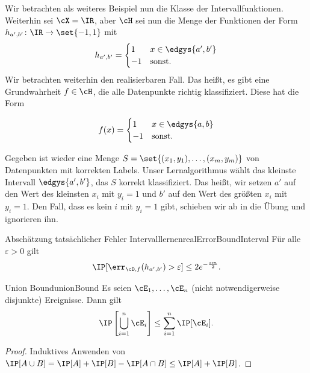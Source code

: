 \documentclass[language=ngerman,algolist,acrolist]{TemplateLecture}
\begin{document}
Wir betrachten als weiteres Beispiel nun die Klasse der Intervallfunktionen. Weiterhin sei $\cX = \IR$, aber $\cH$ sei nun die Menge der Funktionen der Form $h_{a', b'} \colon \IR \to \set{-1,1}$ mit 
\begin{equation*}
    h_{a', b'} = \begin{cases}
        1 & x \in \edgys{a', b'} \\
        -1 & \text{sonst}.
    \end{cases}
\end{equation*}
Wir betrachten weiterhin den realisierbaren Fall. Das heißt, es gibt eine Grundwahrheit $f \in \cH$, die alle Datenpunkte richtig klassifiziert. Diese hat die Form

\begin{equation*}
    f(x) = \begin{cases}
        1 & x \in \edgys{a, b} \\
        -1 & \text{sonst}.
    \end{cases}
\end{equation*}

Gegeben ist wieder eine Menge $S = \set{(x_1, y_1), \dots ,(x_m, y_m)}$ von Datenpunkten mit korrekten Labels. Unser Lernalgorithmus wählt das kleinste Intervall $\edgys{a', b'}$, das $S$ korrekt klassifiziert. Das heißt, wir setzen $a'$ auf den Wert des kleinsten $x_i$ mit $y_i = 1$ und $b'$ auf den Wert des größten $x_i$ mit $y_i = 1$. 
Den Fall, dass es kein $i$ mit $y_i = 1$ gibt, schieben wir ab in die Übung und ignorieren ihn.

\begin{thm}{Abschätzung tatsächlicher Fehler Intervalllernen}{realErrorBoundInterval}
    Für alle $\varepsilon > 0$ gilt 
    \begin{equation*}
        \IP[\err_{\cD, f}(h_{a', b'}) > \varepsilon] \leq 2e^{-\frac{\varepsilon m}{2}}.
    \end{equation*}
\end{thm}

\begin{lem}{Union Bound}{unionBound}
    Es seien $\cE_1, \ldots, \cE_n$ (nicht notwendigerweise disjunkte) Ereignisse. Dann gilt 
    \begin{equation*}
        \IP\left[ \bigcup_{i = 1}^n \cE_i \right] \leq \sum_{i = 1}^n \IP[\cE_i].
    \end{equation*}
\end{lem}
\begin{proof}
    Induktives Anwenden von $\IP[A \cup B] = \IP[A] + \IP[B] - \IP[A \cap B] \leq \IP[A] + \IP[B]$.
\end{proof}
\end{document}
